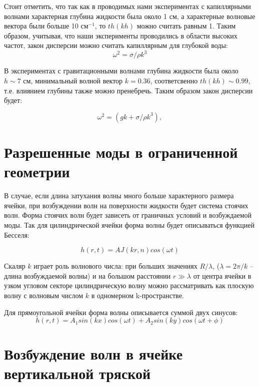 Стоит отметить, что так как в проводимых  нами экспериментах с капиллярными волнами характерная глубина жидкости была около 1 см, а характерные волновые вектора были больше 10 см$^{-1}$, то $th(kh)$ можно считать равным 1.
Таким образом, учитывая, что наши эксперименты проводились в области высоких частот, закон дисперсии можно считать капиллярным для глубокой воды:
\begin{equation}
 \label{eq:disperCap}
\omega^2 = \sigma/\rho k^3
\end{equation}

В экспериментах с гравитационными волнами глубина жидкости была около $ h \sim 7$ см, минимальный волной вектор $k = 0.36$, соответсвенно $th(kh) \sim 0.99$, т.е. влиянием глубины также можно пренебречь. Таким образом закон дисперсии будет:

\begin{equation}
 \label{eq:disperGrav}
\omega^2 = (gk + \sigma/\rho k^3),
\end{equation}

\section{Разрешенные моды в ограниченной геометрии} %
В случае, если длина затухания волны много больше характерного размера ячейки, при возбуждении волн на поверхности жидкости будет система стоячих волн. Форма стоячих волн будет зависеть от граничных условий и возбуждаемой моды.
Так для цилиндрической ячейки форма волны будет описываться функцией Бесселя:

\begin{equation}
 \label{eq:Bessel}
h(r, t) = A J(kr, n) cos(\omega t)
\end{equation}

Скаляр $k$ играет роль волнового числа: при больших значениях $R/\lambda$, ($\lambda = 2\pi/k$ – длина возбуждаемой волны) и на большом расстоянии $r \gg \lambda$ от центра ячейки в узком угловом секторе цилиндрическую волну можно рассматривать как плоскую волну с волновым числом $k$ в одномерном k-пространстве.

Для прямоугольной ячейки форма волны описывается суммой двух синусов:
\begin{equation}
 \label{eq:Bessel}
h(r, t) = A_1 sin(kx)cos(\omega t)+A_2 sin(ky)cos(\omega t+ \phi)
\end{equation}

\section{Возбуждение волн в ячейке вертикальной тряской} %


